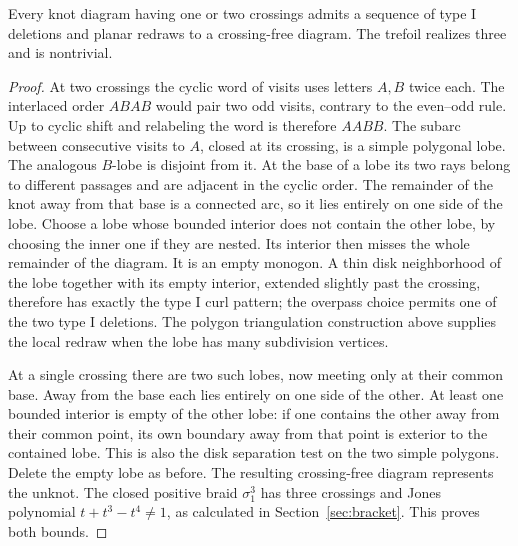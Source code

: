 \begin{theorem}
Every knot diagram having one or two crossings admits a sequence of
type I deletions and planar redraws to a crossing-free diagram. The
trefoil realizes three and is nontrivial.
\end{theorem}
\begin{proof}
At two crossings the cyclic word of visits uses letters $A,B$ twice
each. The interlaced order $ABAB$ would pair two odd visits, contrary
to the even--odd rule. Up to cyclic shift and relabeling the word is
therefore $AABB$. The subarc between consecutive visits to $A$, closed
at its crossing, is a simple polygonal lobe. The analogous $B$-lobe is
disjoint from it. At the base of a lobe its two rays belong to different
passages and are adjacent in the cyclic order. The remainder of the knot
away from that base is a connected arc, so it lies entirely on one side
of the lobe. Choose a lobe whose bounded interior does not contain the
other lobe, by choosing the inner one if they are nested. Its interior
then misses the whole remainder of the diagram. It is an empty monogon.
A thin disk neighborhood of the lobe together with its empty interior,
extended slightly past the crossing, therefore has exactly the type I
curl pattern; the overpass choice permits one of the two type I
deletions. The polygon triangulation construction above supplies the local
redraw when the lobe has many subdivision vertices.

At a single crossing there are two such lobes, now meeting only at
their common base. Away from the base each lies entirely on one side
of the other. At least one bounded interior is empty of the other lobe:
if one contains the other away from their common point, its own boundary
away from that point is exterior to the contained lobe. This is also the
disk separation test on the two simple polygons. Delete the empty lobe
as before. The resulting crossing-free diagram represents the unknot.
The closed positive braid $\sigma_1^3$ has three crossings and Jones
polynomial $t+t^3-t^4\ne1$, as calculated in
Section~\ref{sec:bracket}. This proves both bounds.
\end{proof}
